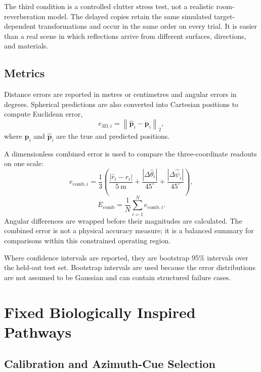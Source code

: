 The third condition is a controlled clutter stress test, not a realistic room-reverberation model. The delayed copies retain the same simulated target-dependent transformations and occur in the same order on every trial. It is easier than a real scene in which reflections arrive from different surfaces, directions, and materials.

\subsection{Metrics}

Distance errors are reported in metres or centimetres and angular errors in degrees. Spherical predictions are also converted into Cartesian positions to compute Euclidean error,
\begin{equation}
    e_{\mathrm{3D},i}
    =
    \left\|
        \hat{\mathbf{p}}_i-\mathbf{p}_i
    \right\|_2 ,
\end{equation}
where $\mathbf{p}_i$ and $\hat{\mathbf{p}}_i$ are the true and predicted positions.

A dimensionless combined error is used to compare the three-coordinate readouts on one scale:
\begin{equation}
    e_{\mathrm{comb},i}
    =
    \frac{1}{3}
    \left(
        \frac{|\hat{r}_i-r_i|}{5~\mathrm{m}}
        +
        \frac{|\Delta\hat{\theta}_i|}{45^\circ}
        +
        \frac{|\Delta\hat{\psi}_i|}{45^\circ}
    \right),
\end{equation}
\begin{equation}
    E_{\mathrm{comb}}
    =
    \frac{1}{N}
    \sum_{i=1}^{N}
    e_{\mathrm{comb},i}.
\end{equation}
Angular differences are wrapped before their magnitudes are calculated. The combined error is not a physical accuracy measure; it is a balanced summary for comparisons within this constrained operating region.

Where confidence intervals are reported, they are bootstrap 95\% intervals over the held-out test set. Bootstrap intervals are used because the error distributions are not assumed to be Gaussian and can contain structured failure cases.

\section{Fixed Biologically Inspired Pathways}

\subsection{Calibration and Azimuth-Cue Selection}

